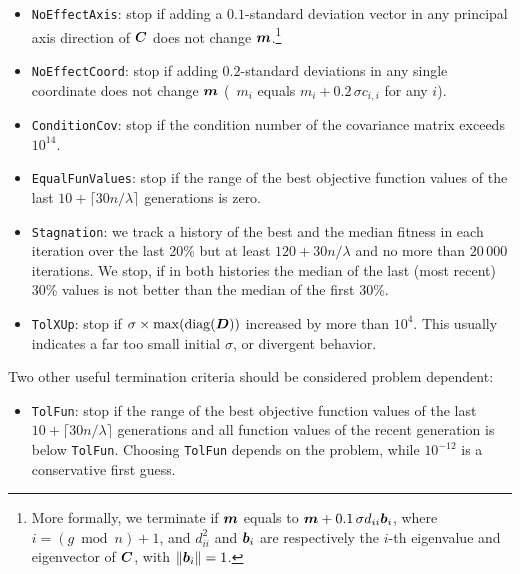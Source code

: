 \documentclass{article} %
\newcommand{\ve}[1]{\mathchoice{\mbox{\boldmath$\displaystyle#1$}}
  {\mbox{\boldmath$\textstyle#1$}} {\mbox{\boldmath$\scriptstyle#1$}}
  {\mbox{\boldmath$\scriptscriptstyle#1$}}}
\newcommand{\N}{\ensuremath{n}}
\newcommand{\sig}{\ensuremath{\sigma}}
\newcommand{\xmean}{\ensuremath{\ve{m}}}
\begin{document}
\begin{appendix}
\begin{itemize}
 \item \texttt{NoEffectAxis}: stop if adding a $0.1$-standard deviation
   vector in any principal axis direction of $\C$ does not change
   $\xmean$.\footnote{More formally, we terminate if $\xmean$ equals to
   $\xmean + 0.1 \, \sig d_{ii} \ve{b}_i$, where $i=(g\bmod
   \N)+1$, and $d_{ii}^2$ and $\ve{b}_i$ are respectively the $i$-th
   eigenvalue and eigenvector of $\C$, with $\|\ve{b}_i\|=1$.}

  \item \texttt{NoEffectCoord}: stop if adding $0.2$-standard
    deviations in any single coordinate does not change $\xmean$
    (\ie\ $m_i$ equals $m_i+0.2\,\sig c_{i,i}$ for any $i$).

  \item \texttt{ConditionCov}: stop if the condition number of the
    covariance matrix exceeds $10^{14}$.

  \item \texttt{EqualFunValues}: stop if the range of the best
    objective function values of the last $10+\lceil 30
    n/\lambda\rceil$ generations is zero.
    
  \item \texttt{Stagnation}: we track a history of the best and the median fitness in each iteration over the last 20\% but at least $120+30\N/\lambda$ and no more than $20\,000$ iterations. We stop, if in both histories the median of the last (most recent) 30\% values is not better than the median of the first 30\%. 

  \item \texttt{TolXUp}: stop if $\sig\times \max(\mathrm{diag}(\D))$
    increased by more than $10^4$. This usually indicates a far too
    small initial $\sig$, or divergent behavior.

\end{itemize}

  Two other useful termination criteria should be considered problem dependent:

\begin{itemize}
  
\item \texttt{TolFun}: stop if the range of the best objective
  function values of the last $10+\lceil 30 n/\lambda\rceil$
  generations and all function values of the recent generation is
  below \texttt{TolFun}. Choosing \texttt{TolFun} depends on the
  problem, while $10^{-12}$ is a conservative first guess.


\end{itemize}
\end{appendix}
\end{document}
